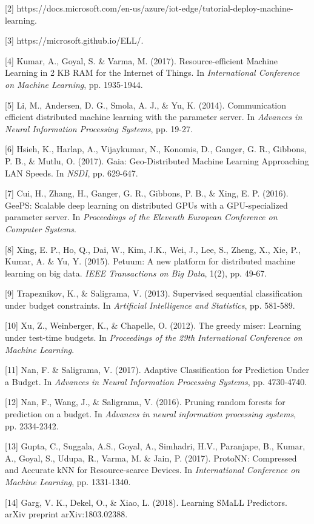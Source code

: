 \documentclass{article}
\begin{document}
[2] https://docs.microsoft.com/en-us/azure/iot-edge/tutorial-deploy-machine-learning.

[3] https://microsoft.github.io/ELL/.

[4] Kumar, A., Goyal, S. \& Varma, M. (2017). Resource-efficient Machine Learning in 2 KB RAM for the Internet of Things. In {\it International Conference on Machine Learning}, pp. 1935-1944.

[5] Li, M., Andersen, D. G., Smola, A. J., \& Yu, K. (2014). Communication efficient distributed machine learning with the parameter server. In {\it Advances in Neural Information Processing Systems}, pp. 19-27.

[6] Hsieh, K., Harlap, A., Vijaykumar, N., Konomis, D., Ganger, G. R., Gibbons, P. B., \& Mutlu, O. (2017). Gaia: Geo-Distributed Machine Learning Approaching LAN Speeds. In {\it NSDI}, pp. 629-647.

[7] Cui, H., Zhang, H., Ganger, G. R., Gibbons, P. B., \& Xing, E. P. (2016). GeePS: Scalable deep learning on distributed GPUs with a GPU-specialized parameter server. In {\it Proceedings of the Eleventh European Conference on Computer Systems}.

[8] Xing, E. P., Ho, Q., Dai, W., Kim, J.K., Wei, J., Lee, S., Zheng, X., Xie, P., Kumar, A. \& Yu, Y. (2015). Petuum: A new platform for distributed machine learning on big data. {\it IEEE Transactions on Big Data}, 1(2), pp. 49-67.

[9] Trapeznikov, K., \& Saligrama, V. (2013). Supervised sequential classification under budget constraints. In {\it Artificial Intelligence and Statistics}, pp. 581-589.

[10] Xu, Z., Weinberger, K., \& Chapelle, O. (2012). The greedy miser: Learning under test-time budgets. In {\it Proceedings of the 29th International Conference on Machine Learning}.

[11] Nan, F. \& Saligrama, V. (2017). Adaptive Classification for Prediction Under a Budget. In {\it Advances in Neural Information Processing Systems}, pp. 4730-4740.

[12] Nan, F., Wang, J., \& Saligrama, V. (2016). Pruning random forests for prediction on a budget. In {\it Advances in neural information processing systems}, pp. 2334-2342.

[13] Gupta, C., Suggala, A.S., Goyal, A., Simhadri, H.V., Paranjape, B., Kumar, A., Goyal, S., Udupa, R., Varma, M. \& Jain, P. (2017). ProtoNN: Compressed and Accurate kNN for Resource-scarce Devices. In {\it International Conference on Machine Learning}, pp. 1331-1340.

[14] Garg, V. K., Dekel, O., \& Xiao, L. (2018). Learning SMaLL Predictors. arXiv preprint arXiv:1803.02388.
\end{document}
